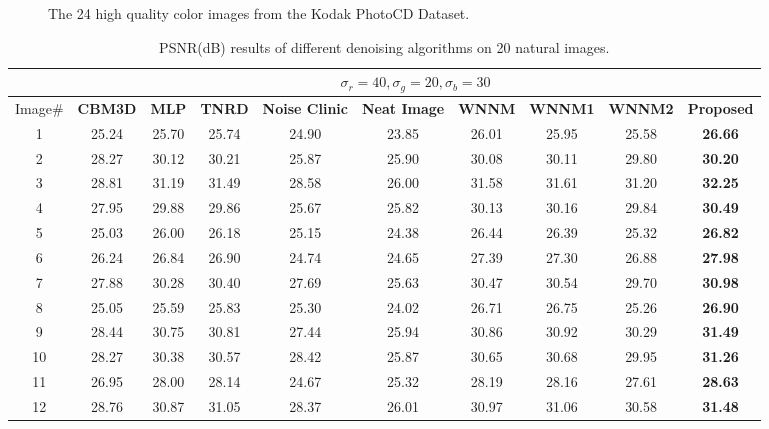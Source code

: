\documentclass[10pt,twocolumn,letterpaper,sort&compress]{article}
\begin{document}
\begin{figure}
{\begin{minipage}{0.075\textwidth}
\end{minipage}
}\vspace{-1mm}
\caption{The 24 high quality color images from the Kodak PhotoCD Dataset.}
\label{fig3}
\vspace{-2mm}
\end{figure}


\begin{table}
\caption{PSNR(dB) results of different denoising algorithms on 20 natural images.}
\label{taba}
\begin{center}
\renewcommand\arraystretch{1.0}
\scriptsize
\begin{tabular}{|c||c|c|c|c|c|c|c|c|c|}
\hline
&\multicolumn{9}{c|}{ $\sigma_{r} = 40, \sigma_{g} = 20, \sigma_{b} = 30$}
\\
\hline
\hline
Image\#
&
\textbf{CBM3D}
&
\textbf{MLP}
&
\textbf{TNRD}
&
\textbf{Noise Clinic}
&
\textbf{Neat Image}
&
\textbf{WNNM}
&
\textbf{WNNM1}
&
\textbf{WNNM2}
&
\textbf{Proposed}
\\
\hline
1& 25.24 & 25.70 & 25.74 & 24.90 & 23.85 & 26.01 & 25.95 & 25.58 & \textbf{26.66}
\\
\hline
2& 28.27 & 30.12 & 30.21 & 25.87 & 25.90 & 30.08 & 30.11 & 29.80 & \textbf{30.20} 
\\
\hline
3 & 28.81 & 31.19 & 31.49 & 28.58 & 26.00 & 31.58 & 31.61 & 31.20 & \textbf{32.25}  
\\
\hline 
4 & 27.95 & 29.88 & 29.86 & 25.67 & 25.82 & 30.13 & 30.16 & 29.84 & \textbf{30.49} 
\\
\hline
5 & 25.03 & 26.00 & 26.18 & 25.15 & 24.38 & 26.44 & 26.39 & 25.32 & \textbf{26.82}
\\
\hline
6 & 26.24 & 26.84 & 26.90 & 24.74 & 24.65 & 27.39 & 27.30 & 26.88 & \textbf{27.98} 
\\
\hline
7 & 27.88 & 30.28 & 30.40 & 27.69 & 25.63 & 30.47 & 30.54 & 29.70 & \textbf{30.98} 
\\
\hline
8 & 25.05 & 25.59 & 25.83 & 25.30 & 24.02 & 26.71 & 26.75 & 25.26 & \textbf{26.90}
\\
\hline
9 & 28.44 & 30.75 & 30.81 & 27.44 & 25.94 & 30.86 & 30.92 & 30.29 & \textbf{31.49}
\\
\hline
10 & 28.27 & 30.38 & 30.57 & 28.42 & 25.87 & 30.65 & 30.68 & 29.95 & \textbf{31.26}
\\
\hline
11 & 26.95 & 28.00 & 28.14 & 24.67 & 25.32 & 28.19 & 28.16 & 27.61 & \textbf{28.63}
\\
\hline
12 & 28.76 & 30.87 & 31.05 & 28.37 & 26.01 & 30.97 & 31.06 & 30.58 & \textbf{31.48}
\\

\end{tabular}
\end{center}
\end{table}
\end{document}
